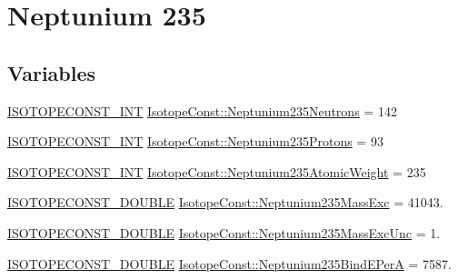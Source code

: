 \hypertarget{group___isotope_const-_neptunium-_np235}{}\section{Neptunium 235}
\label{group___isotope_const-_neptunium-_np235}
\subsection*{Variables}
\begin{DoxyCompactItemize}
\item 
\mbox{\hyperlink{group___isotope_const-_macros_ga5f18360b3e99483a35c32d789e62621c}{I\+S\+O\+T\+O\+P\+E\+C\+O\+N\+S\+T\+\_\+\+I\+NT}} \mbox{\hyperlink{group___isotope_const-_neptunium-_np235_ga5248166975212ce875162f5be3df09e4}{Isotope\+Const\+::\+Neptunium235\+Neutrons}} = 142
\item 
\mbox{\hyperlink{group___isotope_const-_macros_ga5f18360b3e99483a35c32d789e62621c}{I\+S\+O\+T\+O\+P\+E\+C\+O\+N\+S\+T\+\_\+\+I\+NT}} \mbox{\hyperlink{group___isotope_const-_neptunium-_np235_ga2561dbbbfaec92d3dbf7001f68a494b9}{Isotope\+Const\+::\+Neptunium235\+Protons}} = 93
\item 
\mbox{\hyperlink{group___isotope_const-_macros_ga5f18360b3e99483a35c32d789e62621c}{I\+S\+O\+T\+O\+P\+E\+C\+O\+N\+S\+T\+\_\+\+I\+NT}} \mbox{\hyperlink{group___isotope_const-_neptunium-_np235_ga40a65a961f48a5b247a89543af0b9056}{Isotope\+Const\+::\+Neptunium235\+Atomic\+Weight}} = 235
\item 
\mbox{\hyperlink{group___isotope_const-_macros_ga8f45a7272ce02c0b4c65c44636ed719a}{I\+S\+O\+T\+O\+P\+E\+C\+O\+N\+S\+T\+\_\+\+D\+O\+U\+B\+LE}} \mbox{\hyperlink{group___isotope_const-_neptunium-_np235_gaae821664e2a1763c9262a8f0313e95c4}{Isotope\+Const\+::\+Neptunium235\+Mass\+Exc}} = 41043.
\item 
\mbox{\hyperlink{group___isotope_const-_macros_ga8f45a7272ce02c0b4c65c44636ed719a}{I\+S\+O\+T\+O\+P\+E\+C\+O\+N\+S\+T\+\_\+\+D\+O\+U\+B\+LE}} \mbox{\hyperlink{group___isotope_const-_neptunium-_np235_gab823b86a11487ff3c12b5d2c0d72e74d}{Isotope\+Const\+::\+Neptunium235\+Mass\+Exc\+Unc}} = 1.
\item 
\mbox{\hyperlink{group___isotope_const-_macros_ga8f45a7272ce02c0b4c65c44636ed719a}{I\+S\+O\+T\+O\+P\+E\+C\+O\+N\+S\+T\+\_\+\+D\+O\+U\+B\+LE}} \mbox{\hyperlink{group___isotope_const-_neptunium-_np235_ga718c604b0164756cc7512619a4d72ae5}{Isotope\+Const\+::\+Neptunium235\+Bind\+E\+PerA}} = 7587.
\item 

\end{DoxyCompactItemize}
